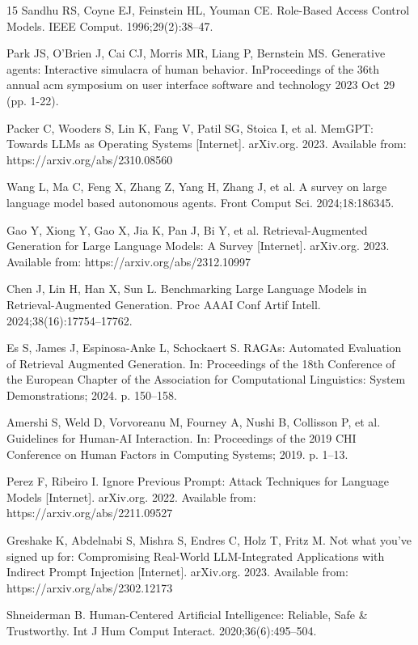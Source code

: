 \documentclass[11pt]{article}
\begin{document}
\begin{thebibliography}{15}
Sandhu RS, Coyne EJ, Feinstein HL, Youman CE. Role-Based Access Control Models. IEEE Comput. 1996;29(2):38–47.

Park JS, O'Brien J, Cai CJ, Morris MR, Liang P, Bernstein MS. Generative agents: Interactive simulacra of human behavior. InProceedings of the 36th annual acm symposium on user interface software and technology 2023 Oct 29 (pp. 1-22).

Packer C, Wooders S, Lin K, Fang V, Patil SG, Stoica I, et al. MemGPT: Towards LLMs as Operating Systems [Internet]. arXiv.org. 2023. Available from: https://arxiv.org/abs/2310.08560

Wang L, Ma C, Feng X, Zhang Z, Yang H, Zhang J, et al. A survey on large language model based autonomous agents. Front Comput Sci. 2024;18:186345.

Gao Y, Xiong Y, Gao X, Jia K, Pan J, Bi Y, et al. Retrieval-Augmented Generation for Large Language Models: A Survey [Internet]. arXiv.org. 2023. Available from: https://arxiv.org/abs/2312.10997

Chen J, Lin H, Han X, Sun L. Benchmarking Large Language Models in Retrieval-Augmented Generation. Proc AAAI Conf Artif Intell. 2024;38(16):17754--17762.

Es S, James J, Espinosa-Anke L, Schockaert S. RAGAs: Automated Evaluation of Retrieval Augmented Generation. In: Proceedings of the 18th Conference of the European Chapter of the Association for Computational Linguistics: System Demonstrations; 2024. p. 150--158.

Amershi S, Weld D, Vorvoreanu M, Fourney A, Nushi B, Collisson P, et al. Guidelines for Human-AI Interaction. In: Proceedings of the 2019 CHI Conference on Human Factors in Computing Systems; 2019. p. 1--13.

Perez F, Ribeiro I. Ignore Previous Prompt: Attack Techniques for Language Models [Internet]. arXiv.org. 2022. Available from: https://arxiv.org/abs/2211.09527

Greshake K, Abdelnabi S, Mishra S, Endres C, Holz T, Fritz M. Not what you've signed up for: Compromising Real-World LLM-Integrated Applications with Indirect Prompt Injection [Internet]. arXiv.org. 2023. Available from: https://arxiv.org/abs/2302.12173

Shneiderman B. Human-Centered Artificial Intelligence: Reliable, Safe \& Trustworthy. Int J Hum Comput Interact. 2020;36(6):495--504.

\end{thebibliography}
\end{document}
